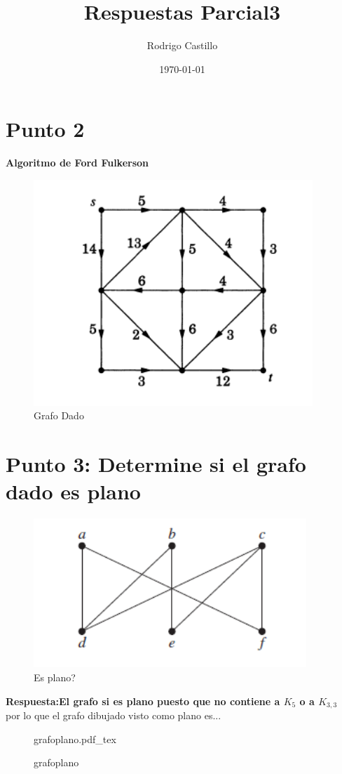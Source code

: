 \documentclass[10pt,a4paper]{article} %
\newcommand{\incfig}[1]{%
    \def\svgwidth{\columnwidth}
    {#1.pdf_tex}
}
\begin{document}
    \title{{  Respuestas Parcial3  }}
    \author{{Rodrigo Castillo}}
    \date{\today}

    \maketitle


    \section{Punto 2}
    \textbf{Algoritmo de Ford Fulkerson}

    \begin{figure}[h!]
        \centering
        \includegraphics[width=0.4\linewidth]{grafodado.png}
        \caption{Grafo Dado}
        \label{fig}
    \end{figure}


    \section{Punto 3: Determine si el grafo dado es plano }
    \begin{figure}[h!]
        \centering
        \includegraphics[width=0.4\linewidth]{plano.png}
        \caption{Es plano?}
        \label{fig}
    \end{figure}
    \textbf{Respuesta:El grafo si es plano puesto que no contiene a $K_5$ o a $K_{3,3}$}
    \\
    por lo que el grafo dibujado visto como plano es...
    \\
    \begin{figure}[ht]
        \centering
        \incfig{grafoplano}
        \caption{grafoplano}
        \label{fig:grafoplano}
    \end{figure}
\end{document}
